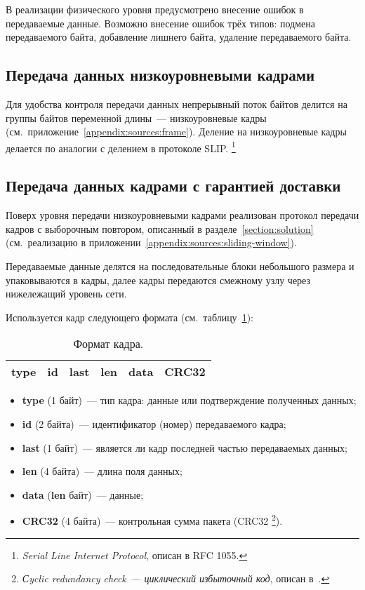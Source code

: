 \documentclass[a4paper,10pt]{article}
\begin{document}
В реализации физического уровня предусмотрено внесение ошибок в передаваемые данные.
Возможно внесение ошибок трёх типов: подмена передаваемого байта, 
добавление лишнего байта, удаление передаваемого байта.

\subsection{Передача данных низкоуровневыми кадрами}
Для удобства контроля передачи данных 
непрерывный поток байтов делится на группы байтов переменной длины~--- 
низкоуровневые кадры
(см.~приложение~\ref{appendix:sources:frame}).
Деление на низкоуровневые кадры делается по аналогии с делением в протоколе SLIP.%
\footnote{\textit{Serial Line Internet Protocol}, описан в RFC 1055.}

\subsection{Передача данных кадрами с гарантией доставки}
Поверх уровня передачи низкоуровневыми кадрами 
реализован протокол передачи кадров с выборочным повтором,
описанный в разделе~\ref{section:solution} 
(см.~реализацию в приложении~\ref{appendix:sources:sliding-window}).

Передаваемые данные делятся на последовательные блоки небольшого размера и 
упаковываются в кадры,
далее кадры передаются смежному узлу через 
нижележащий уровень сети.

Используется кадр следующего формата (см.~таблицу~\ref{table:frame}):
\begin{table}[h]
  \begin{center}
    \begin{tabular}{|c|c|c|c|c|c|}
      \hline
      type & id & last & len & data & CRC32 \\
      \hline
    \end{tabular}
  \end{center}
  \caption{Формат кадра.}
  \label{table:frame}
\end{table}
\begin{itemize}
  \item \textbf{type} (1 байт)~--- 
  тип кадра: данные или подтверждение полученных данных;
  \item \textbf{id} (2 байта)~--- 
  идентификатор (номер) передаваемого кадра;
  \item \textbf{last} (1 байт)~--- 
  является ли кадр последней частью передаваемых данных;
  \item \textbf{len} (4 байта)~--- длина поля данных;
  \item \textbf{data} (\textbf{len} байт)~--- данные;
  \item \textbf{CRC32} (4 байта)~--- контрольная сумма пакета (CRC32%
\footnote{\textit{Сyclic redundancy check}~--- \textit{циклический избыточный код}, %
описан в~\cite{peterson1961crc}.%
}).
\end{itemize}
\end{document}
